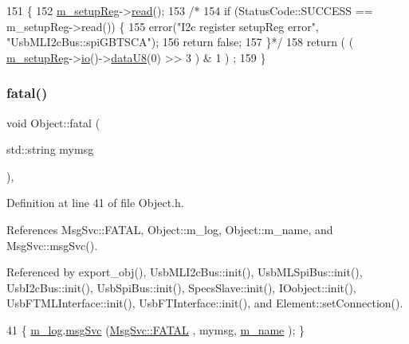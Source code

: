 \begin{DoxyCode}
151                      \{
152   \hyperlink{classSeqPGA_a03269241e7fc26493cd0595beda334c2}{m\_setupReg}->\hyperlink{classIOobject_aa07610c11963b1db6710e3c76ceea456}{read}();
153   \textcolor{comment}{/*}
154 \textcolor{comment}{    if (StatusCode::SUCCESS == m\_setupReg->read()) \{}
155 \textcolor{comment}{    error("I2c register setupReg error", "UsbMLI2cBus::spiGBTSCA");}
156 \textcolor{comment}{    return false;}
157 \textcolor{comment}{    \}*/}
158   \textcolor{keywordflow}{return} ( ( \hyperlink{classSeqPGA_a03269241e7fc26493cd0595beda334c2}{m\_setupReg}->\hyperlink{classIOobject_af04fb94137c3d86849f478ac5afab5d1}{io}()->\hyperlink{classIOdata_a75e9c318dbac3a39402179070943d4bc}{dataU8}(0) >> 3 ) & 1 ) ;
159 \}
\end{DoxyCode}
\mbox{\label{classObject_aad5a16aac7516ce65bd5ec02ab07fc80}} 
\subsubsection{\texorpdfstring{fatal()}{fatal()}\hspace{0.1cm}{\footnotesize\ttfamily [1/2]}}
{\footnotesize\ttfamily void Object\+::fatal (\begin{DoxyParamCaption}\item[{std\+::string}]{mymsg }\end{DoxyParamCaption})\hspace{0.3cm}{\ttfamily [inline]}, {\ttfamily [inherited]}}



Definition at line 41 of file Object.\+h.



References Msg\+Svc\+::\+F\+A\+T\+AL, Object\+::m\+\_\+log, Object\+::m\+\_\+name, and Msg\+Svc\+::msg\+Svc().



Referenced by export\+\_\+obj(), Usb\+M\+L\+I2c\+Bus\+::init(), Usb\+M\+L\+Spi\+Bus\+::init(), Usb\+I2c\+Bus\+::init(), Usb\+Spi\+Bus\+::init(), Specs\+Slave\+::init(), I\+Oobject\+::init(), Usb\+F\+T\+M\+L\+Interface\+::init(), Usb\+F\+T\+Interface\+::init(), and Element\+::set\+Connection().


\begin{DoxyCode}
41 \{ \hyperlink{classObject_a0d269813dd7ac1f24bc143031e2963f2}{m\_log}.\hyperlink{classMsgSvc_ad25f18047920cc59a314e5098259711c}{msgSvc} (\hyperlink{classMsgSvc_ae671eb7301996cd049d2da8a65925926a59c73cb29edfc9cdf35845e2b1301363}{MsgSvc::FATAL}   , mymsg, \hyperlink{classObject_a8b83c95c705d2c3ba0d081fe1710f48d}{m\_name} ); \}
\end{DoxyCode}
\mbox{\label{classObject_ae62acd3d09f716220f75f252dc38bc9a}} 
